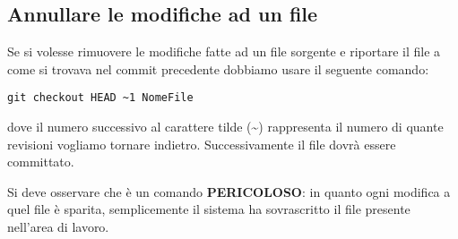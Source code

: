 \subsection{Annullare le modifiche ad un file}
Se si volesse rimuovere le modifiche fatte ad un file sorgente e riportare il file a come si trovava nel commit precedente dobbiamo usare il seguente comando:

\begin{center}
\texttt{git checkout HEAD \textasciitilde 1 NomeFile}

\end{center}

dove il numero successivo al carattere tilde (\textasciitilde) rappresenta il numero di quante revisioni vogliamo tornare indietro. Successivamente il file dovrà essere committato.

Si deve osservare che è un comando \textbf{PERICOLOSO}: in quanto ogni modifica a quel file è sparita, semplicemente il sistema ha sovrascritto il file presente nell'area di lavoro.

